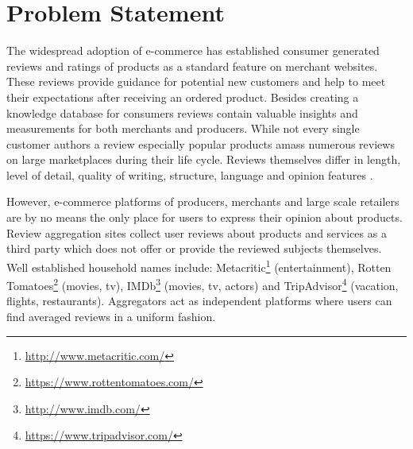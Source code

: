 \section{Problem Statement}
The widespread adoption of e-commerce has established consumer generated reviews and ratings of products as a standard feature on merchant websites.
These reviews provide guidance for potential new customers and help to meet their expectations after receiving an ordered product.
Besides creating a knowledge database for consumers reviews contain valuable insights and measurements for both merchants and producers.
While not every single customer authors a review especially popular products amass numerous reviews on large marketplaces during their life cycle.
Reviews themselves differ in length, level of detail, quality of writing, structure, language and opinion features \cite{Hu2004a}.

However, e-commerce platforms of producers, merchants and large scale retailers are by no means the only place for users to express their opinion about products.
Review aggregation sites collect user reviews about products and services as a third party which does not offer or provide the reviewed subjects themselves.
Well established household names include: Metacritic\footnote{\url{http://www.metacritic.com/}} (entertainment), Rotten Tomatoes\footnote{\url{https://www.rottentomatoes.com/}} (movies, tv), IMDb\footnote{\url{http://www.imdb.com/}} (movies, tv, actors) and TripAdvisor\footnote{\url{https://www.tripadvisor.com/}} (vacation, flights, restaurants).
Aggregators act as independent platforms where users can find averaged reviews in a uniform fashion.

